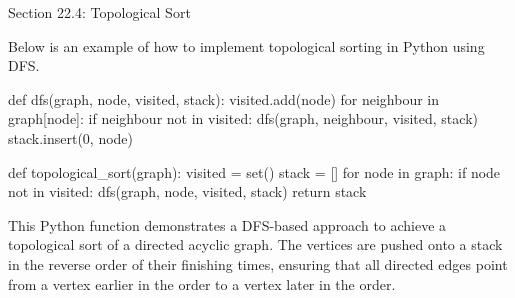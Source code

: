 \begin{notes}{Section 22.4: Topological Sort}
    \begin{highlight}
        Below is an example of how to implement topological sorting in Python using DFS.
    \begin{code}[Python]
    def dfs(graph, node, visited, stack):
        visited.add(node)
        for neighbour in graph[node]:
            if neighbour not in visited:
                dfs(graph, neighbour, visited, stack)
        stack.insert(0, node)
    
    def topological_sort(graph):
        visited = set()
        stack = []
        for node in graph:
            if node not in visited:
                dfs(graph, node, visited, stack)
        return stack
    \end{code}
    
        This Python function demonstrates a DFS-based approach to achieve a topological sort of a directed acyclic graph. The vertices are pushed onto a stack in the reverse order of their finishing 
        times, ensuring that all directed edges point from a vertex earlier in the order to a vertex later in the order.
    \end{highlight}    
\end{notes}